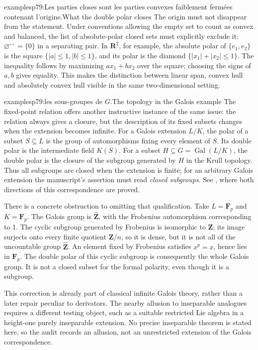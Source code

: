 \begin{dcomment}{examples}{p79:Les parties closes sont les parties convexes faiblement fermées contenant l'origine.}{What the double polar closes}
The origin must not disappear from the statement. Under conventions allowing the empty set to count as convex and balanced, the list of absolute-polar closed sets must explicitly exclude it: $\varnothing^{\circ\circ}=\{0\}$ in a separating pair. In $\mathbf R^2$, for example, the absolute polar of $\{e_1,e_2\}$ is the square $\{|a|\leq1,|b|\leq1\}$, and its polar is the diamond $\{|x_1|+|x_2|\leq1\}$. The inequality follows by maximizing $ax_1+bx_2$ over the square; choosing the signs of $a,b$ gives equality. This makes the distinction between linear span, convex hull and absolutely convex hull visible in the same two-dimensional setting.
\end{dcomment}

\begin{dcomment}{examples}{p79:les sous-groupes de $G$.}{The topology in the Galois example}
The fixed-point relation offers another instructive instance of the same issue: the relation always gives a closure, but the description of its fixed subsets changes when the extension becomes infinite. For a Galois extension $L/K$, the polar of a subset $S\subseteq L$ is the group of automorphisms fixing every element of $S$. Its double polar is the intermediate field $K(S)$. For a subset $H\subseteq G=\operatorname{Gal}(L/K)$, the double polar is the closure of the subgroup generated by $H$ in the Krull topology. Thus all subgroups are closed when the extension is finite; for an arbitrary Galois extension the manuscript's assertion must read \emph{closed subgroups}. See \citet[Proposition 7.12 and Theorem 7.13]{Milne2022FT}, where both directions of this correspondence are proved.

There is a concrete obstruction to omitting that qualification. Take $L=\overline{\mathbf F}_p$ and $K=\mathbf F_p$. The Galois group is $\widehat{\mathbf Z}$, with the Frobenius automorphism corresponding to $1$. The cyclic subgroup generated by Frobenius is isomorphic to $\mathbf Z$; its image surjects onto every finite quotient $\mathbf Z/n$, so it is dense, but it is not all of the uncountable group $\widehat{\mathbf Z}$. An element fixed by Frobenius satisfies $x^p=x$, hence lies in $\mathbf F_p$. The double polar of this cyclic subgroup is consequently the whole Galois group. It is not a closed subset for the formal polarity, even though it is a subgroup.

This correction is already part of classical infinite Galois theory, rather than a later repair peculiar to derivators. The nearby allusion to inseparable analogues requires a different testing object, such as a suitable restricted Lie algebra in a height-one purely inseparable extension. No precise inseparable theorem is stated here, so the audit records an allusion, not an unrestricted extension of the Galois correspondence.
\end{dcomment}

